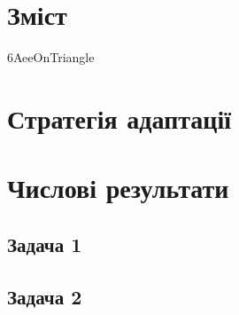 \documentclass[a4paper,oneside]{article}
\begin{document}
	\pagestyle{empty} %

	

	\linespread{1.75}
	\selectfont
	\addtocounter{page}{1}

	\section*{Зміст}

	\makeatletter
	\makeatother

	\newpage
	\pagestyle{plain}

	
	
	
	
	
	{6AeeOnTriangle}

	\section{Стратегія адаптації}

	\section{Числові результати}
		\subsection{Задача 1}
		\subsection{Задача 2}
\end{document}
